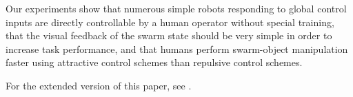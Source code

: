 Our experiments show that numerous simple robots responding to global control inputs are directly controllable by a human operator without special training, that the visual feedback of the swarm state should be very simple in order to increase task performance, and that humans perform swarm-object manipulation faster using attractive control schemes than repulsive control schemes.

For the extended version of this paper, see \cite{Becker2014e}.





